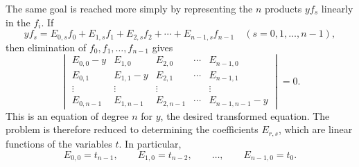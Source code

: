 \documentclass[11pt]{article}
\begin{document}
The same goal is reached more simply by representing the $n$ products $yf_s$ linearly in the $f_i$. If
\begin{equation}
 yf_s=E_{0,s}f_0+E_{1,s}f_1+E_{2,s}f_2+\cdots+E_{n-1,s}f_{n-1}
 \quad (s=0,1,\ldots,n-1),
\tag{3}
\end{equation}
then elimination of $f_0,f_1,\ldots,f_{n-1}$ gives
\begin{equation}
\begin{vmatrix}
 E_{0,0}-y&E_{1,0}&E_{2,0}&\cdots&E_{n-1,0}\\
 E_{0,1}&E_{1,1}-y&E_{2,1}&\cdots&E_{n-1,1}\\
 \vdots&\vdots&\vdots&&\vdots\\
 E_{0,n-1}&E_{1,n-1}&E_{2,n-1}&\cdots&E_{n-1,n-1}-y
\end{vmatrix}=0.
\tag{4}
\end{equation}
This is an equation of degree $n$ for $y$, the desired transformed equation. The problem is therefore reduced to determining the coefficients $E_{r,s}$, which are linear functions of the variables $t$. In particular,
\begin{equation}
 E_{0,0}=t_{n-1},
 \qquad E_{1,0}=t_{n-2},
 \qquad\ldots,
 \qquad E_{n-1,0}=t_0.
\tag{5}
\end{equation}
\end{document}
